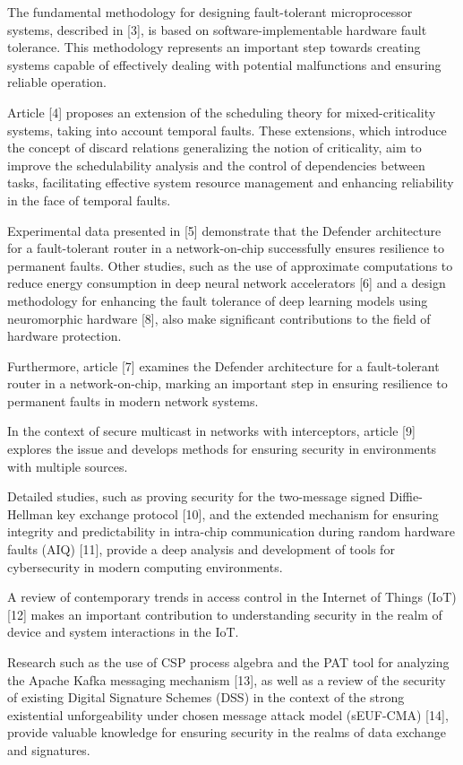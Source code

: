 The fundamental methodology for designing fault-tolerant microprocessor
systems, described in {[}3{]}, is based on software-implementable
hardware fault tolerance. This methodology represents an important step
towards creating systems capable of effectively dealing with potential
malfunctions and ensuring reliable operation.

Article {[}4{]} proposes an extension of the scheduling theory for
mixed-criticality systems, taking into account temporal faults. These
extensions, which introduce the concept of discard relations
generalizing the notion of criticality, aim to improve the
schedulability analysis and the control of dependencies between tasks,
facilitating effective system resource management and enhancing
reliability in the face of temporal faults.

Experimental data presented in {[}5{]} demonstrate that the Defender
architecture for a fault-tolerant router in a network-on-chip
successfully ensures resilience to permanent faults. Other studies, such
as the use of approximate computations to reduce energy consumption in
deep neural network accelerators {[}6{]} and a design methodology for
enhancing the fault tolerance of deep learning models using neuromorphic
hardware {[}8{]}, also make significant contributions to the field of
hardware protection.

Furthermore, article {[}7{]} examines the Defender architecture for a
fault-tolerant router in a network-on-chip, marking an important step in
ensuring resilience to permanent faults in modern network systems.

In the context of secure multicast in networks with interceptors,
article {[}9{]} explores the issue and develops methods for ensuring
security in environments with multiple sources.

Detailed studies, such as proving security for the two-message signed
Diffie-Hellman key exchange protocol {[}10{]}, and the extended
mechanism for ensuring integrity and predictability in intra-chip
communication during random hardware faults (AIQ) {[}11{]}, provide a
deep analysis and development of tools for cybersecurity in modern
computing environments.

A review of contemporary trends in access control in the Internet of
Things (IoT) {[}12{]} makes an important contribution to understanding
security in the realm of device and system interactions in the IoT.

Research such as the use of CSP process algebra and the PAT tool for
analyzing the Apache Kafka messaging mechanism {[}13{]}, as well as a
review of the security of existing Digital Signature Schemes (DSS) in
the context of the strong existential unforgeability under chosen
message attack model (sEUF-CMA) {[}14{]}, provide valuable knowledge for
ensuring security in the realms of data exchange and signatures.

